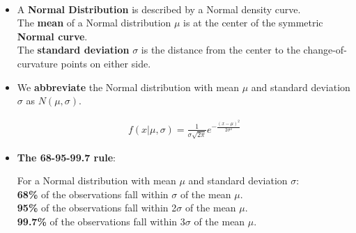 \documentclass[Main.tex]{subfiles}
\begin{document}
	\begin{exercise} \hfill \\
		\begin{itemize}
			\item A \textbf{Normal Distribution} is described by a Normal density curve.\\ The \textbf{mean} of a Normal distribution $\mu$ is at the center of the symmetric \textbf{Normal curve}.\\ The \textbf{standard deviation} $\sigma$ is the distance from the center to the change-of-curvature points on either side.\\
			
			\item We \textbf{abbreviate} the Normal distribution with mean $\mu$ and standard deviation $\sigma$ as $N(\mu,\sigma)$.
			
			\begin{definition}			
			\begin{subequations}
				\begin{align}
				f(x|\mu,\sigma)=\frac{1}{\sigma\sqrt{2\pi}}e^{-\frac{(x-\mu)^{2}}{2\sigma^{2}}}
				\end{align}
			\end{subequations}	
			\end{definition}\hfill 

			\item \textbf{The 68-95-99.7 rule}:\hfill 
			
			For a Normal distribution with mean $\mu$ and standard deviation $\sigma$:\\
			\textbf{68\%} of the observations fall within $\sigma$ of the mean $\mu$.\\
			\textbf{95\%} of the observations fall within 2$\sigma$ of the mean $\mu$.\\
			\textbf{99.7\%} of the observations fall within 3$\sigma$ of the mean $\mu$.
			

\end{itemize}
\end{exercise}
\end{document}
